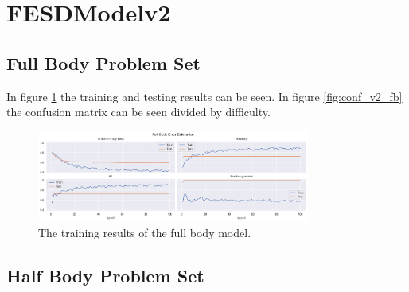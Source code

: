 
\section{FESDModelv2}

\subsection{Full Body Problem Set}
In figure \ref{fig:full_body_training_results_v2} the training and testing results can be seen. In figure \ref{fig:conf_v2_fb} the confusion matrix can be seen divided by difficulty.

\begin{figure}[ht]
  \centering
  \includegraphics[width=0.8\textwidth]{figures/Results/v2_bs_40_is_64_e_100/fb/FullBody_ErrorEstimation.png}
  \caption[Full Body model training results]{The training results of the full body model.}
  \label{fig:full_body_training_results_v2}
\end{figure}

\subsection{Half Body Problem Set}


